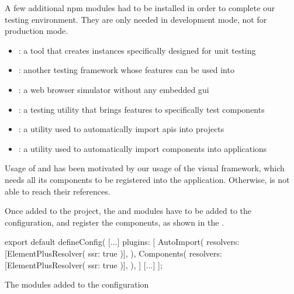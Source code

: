 A few additional \gls{npm} modules had to be installed in order to complete our testing environment. They are only needed in development mode, not for production mode.
\begin{itemize}
	\item {}: a tool that creates  instances specifically designed for unit testing
	\item {}: another testing \gls{framework} whose features can be used into 
	\item {}: a web browser simulator without any embedded \gls{gui}
	\item {}: a testing utility that brings features to specifically test  components
	\item {}: a utility used to automatically import \glspl{api} into  projects
	\item {}: a utility used to automatically import  components into  applications
\end{itemize}

Usage of  and  has been motivated by our usage of the  visual \gls{framework}, which needs all its components to be registered into the  application. Otherwise,  is not able to reach their references. 

Once added to the  project, the  and  modules have to be added to the  configuration, and register the  components, as shown in the .

\begin{listing}[!ht] 
	\begin{javascriptcode}
export default defineConfig({
	[...]
	plugins: [
		AutoImport({
			resolvers: [ElementPlusResolver({ ssr: true })],
		}),
		Components({
			resolvers: [ElementPlusResolver({ ssr: true })],
		}),
	]
	[...]
}];
	\end{javascriptcode}
	\caption{The modules added to the  configuration}
	\label{lst:app_test_modules}
\end{listing}

